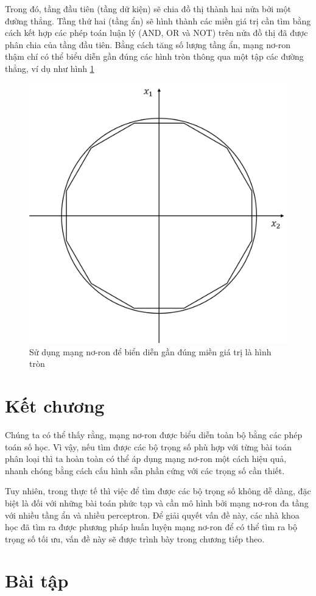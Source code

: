 Trong đó, tầng đầu tiên (tầng dữ kiện) sẽ chia đồ thị thành hai nửa bởi một đường thẳng. Tầng thứ hai (tầng ẩn) sẽ hình thành các miền giá trị cần tìm bằng cách kết hợp các phép toán luận lý (AND, OR và NOT) trên nửa đồ thị đã được phân chia của tầng đầu tiên. Bằng cách tăng số lượng tầng ẩn, mạng nơ-ron thậm chí có thể biểu diễn gần đúng các hình tròn thông qua một tập các đường thẳng, ví dụ như hình \ref{fig:circleNeuron}

\begin{figure}[!h]
	\centering
		\includegraphics[width=0.5\columnwidth]{chapter01/figure/Picture5.png}
    	\caption{Sử dụng mạng nơ-ron để biển diễn gần đúng miền giá trị là hình tròn}
	\centering
	\label{fig:circleNeuron}
\end{figure}

\section{Kết chương}
\label{sec:endChp}

Chúng ta có thể thấy rằng, mạng nơ-ron được biểu diễn toàn bộ bằng các phép toán số học. Vì vậy, nếu tìm được các bộ trọng số phù hợp với từng bài toán phân loại thì ta hoàn toàn có thể áp dụng mạng nơ-ron một cách hiệu quả, nhanh chóng bằng cách cấu hình sẵn phần cứng với các trọng số cần thiết. 

Tuy nhiên, trong thực tế thì việc để tìm được các bộ trọng số không dễ dàng, đặc biệt là đối với những bài toán phức tạp và cần mô hình bởi mạng nơ-ron đa tầng với nhiều tầng ẩn và nhiều perceptron. Để giải quyết vấn đề này, các nhà khoa học đã tìm ra được phương pháp huấn luyện mạng nơ-ron để có thể tìm ra bộ trọng số tối ưu, vấn đề này sẽ được trình bày trong chương tiếp theo.

\newpage

\section{Bài tập}

